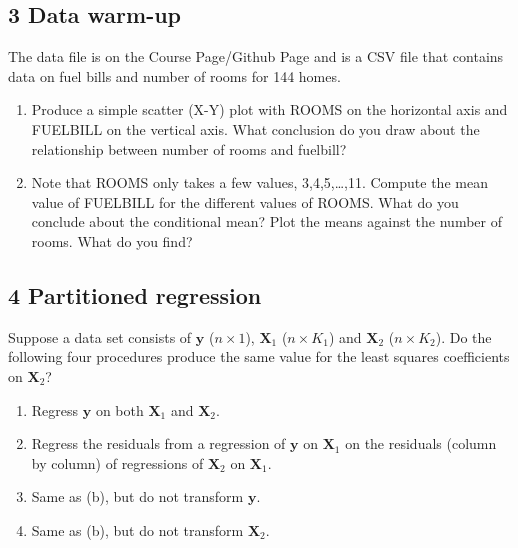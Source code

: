 \documentclass[11pt]{article}
\begin{document}
\subsection*{3 Data warm-up}

The data file is on the Course Page/Github Page and is a CSV file that contains data on fuel bills and number of rooms for 144 homes. 

\begin{enumerate}[label=\alph*)]
\item Produce a simple scatter (X-Y) plot with ROOMS on the horizontal axis
and FUELBILL on the vertical axis. What conclusion do you draw about
the relationship between number of rooms and fuelbill? 

\item Note that ROOMS only takes a few values, 3,4,5,\dots ,11. Compute
the mean value of FUELBILL for the different values of ROOMS. What
do you conclude about the conditional mean? Plot the means against
the number of rooms. What do you find?
\end{enumerate}



\subsection*{4 Partitioned regression}
Suppose a data set consists of $\boldsymbol{y}$ ($n \times 1$), $\boldsymbol{X}_{1}$ ($n \times K_{1}$)
and $\boldsymbol{X}_{2}$  ($n \times K_{2}$). Do the following four procedures
produce the same value for the least squares coefficients on $\boldsymbol{X}_{2}$?
\begin{enumerate}[label=\alph*)]
\item Regress $\boldsymbol{y}$ on both $\boldsymbol{X}_{1}$ and $\boldsymbol{X}_{2}$. 
\item Regress the residuals from a regression of $\boldsymbol{y}$ on $\boldsymbol{X}_{1}$ on the
residuals (column by column) of regressions of $\boldsymbol{X}_{2}$ on $\boldsymbol{X}_{1}$. 
\item Same as (b), but do not transform $\boldsymbol{y}$. 
\item Same as (b), but do not transform $\boldsymbol{X}_{2}$.
\end{enumerate}
\end{document}
